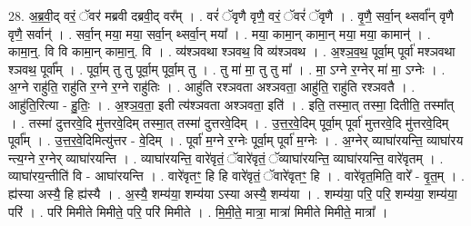 \documentclass[17pt]{extarticle}
\begin{document}
28. अ॒ब्र॒वी॒द् वरं॒ ॅवर॑ मब्रवी दब्रवी॒द् वर᳚म् । . वरं॑ ॅवृणै वृणै॒ वरं॒ ॅवरं॑ ॅवृणै । . वृ॒णै॒ सर्वा॒न् थ्सर्वा᳚न् वृणै वृणै॒ सर्वान्॑ । . सर्वा॒न् मया॒ मया॒ सर्वा॒न् थ्सर्वा॒न् मया᳚ । . मया॒ कामा॒न् कामा॒न् मया॒ मया॒ कामान्॑ । . कामा॒न्॒. वि वि कामा॒न् कामा॒न्॒. वि । . व्य॑श्ञवथा श्ञवथ॒ वि व्य॑श्ञवथ । . अ॒श्ञ॒व॒थ॒ पूर्वा॒म् पूर्वा॑ मश्ञवथा श्ञवथ॒ पूर्वा᳚म् । . पूर्वा॒म् तु तु पूर्वा॒म् पूर्वा॒म् तु । . तु मा॑ मा॒ तु तु मा᳚ । . मा॒ ऽग्ने र॒ग्नेर् मा॑ मा॒ ऽग्नेः । . अ॒ग्ने राहु॑ति॒ राहु॑ति र॒ग्ने र॒ग्ने राहु॑तिः । . आहु॑ति रश्ञवता अश्ञवता॒ आहु॑ति॒ राहु॑ति रश्ञवतै । . आहु॑ति॒रित्या - हु॒तिः॒ । . अ॒श्ञ॒व॒ता॒ इती त्य॑श्ञवता अश्ञवता॒ इति॑ । . इति॒ तस्मा॒त् तस्मा॒ दितीति॒ तस्मा᳚त् । . तस्मा॑ दुत्तरवे॒दि मु॑त्तरवे॒दिम् तस्मा॒त् तस्मा॑ दुत्तरवे॒दिम् । . उ॒त्त॒र॒वे॒दिम् पूर्वा॒म् पूर्वा॑ मुत्तरवे॒दि मु॑त्तरवे॒दिम् पूर्वा᳚म् । . उ॒त्त॒र॒वे॒दिमित्यु॑त्तर - वे॒दिम् । . पूर्वा॑ म॒ग्ने र॒ग्नेः पूर्वा॒म् पूर्वा॑ म॒ग्नेः । . अ॒ग्नेर् व्याघा॑रयन्ति॒ व्याघा॑रय न्त्य॒ग्ने र॒ग्नेर् व्याघा॑रयन्ति । . व्याघा॑रयन्ति॒ वारे॑वृतं॒ ॅवारे॑वृतं॒ ॅव्याघा॑रयन्ति॒ व्याघा॑रयन्ति॒ वारे॑वृतम् । . व्याघा॑रय॒न्तीति॑ वि - आघा॑रयन्ति । . वारे॑वृतꣳ॒॒ हि हि वारे॑वृतं॒ ॅवारे॑वृतꣳ॒॒ हि । . वारे॑वृत॒मिति॒ वारे᳚ - वृ॒त॒म् । . ह्य॑स्या अस्यै॒ हि ह्य॑स्यै । . अ॒स्यै॒ शम्य॑या॒ शम्य॑या ऽस्या अस्यै॒ शम्य॑या । . शम्य॑या॒ परि॒ परि॒ शम्य॑या॒ शम्य॑या॒ परि॑ । . परि॑ मिमीते मिमीते॒ परि॒ परि॑ मिमीते । . मि॒मी॒ते॒ मात्रा॒ मात्रा॑ मिमीते मिमीते॒ मात्रा᳚ । \newline
\end{document}
